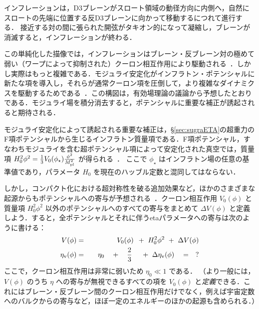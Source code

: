 インフレーションは，D3ブレーンがスロート領域の動径方向に内側へ，自然にスロートの先端に位置する反D3ブレーンに向かって移動するにつれて進行する．
接近する対の間に張られた開弦がタキオン的になって凝縮し，ブレーンが消滅すると，インフレーションが終わる．


この単純化した描像では，インフレーションはブレーン・反ブレーン対の極めて弱い（ワープによって抑制された）クーロン相互作用により駆動される~\cite{KKLMMT}．しかし実際はもっと複雑である．モジュライ安定化がインフラトン・ポテンシャルに新たな項を導入し，それらが通常クーロン項を圧倒して，より複雑なダイナミクスを駆動するためである~\cite{KKLMMT,Baumann:2006th, Baumann:2007np, Baumann:2007ah, Krause:2007jk, Baumann:2008kq}．この構図は，有効場理論の議論から予想したとおりである．モジュライ場を積分消去すると，ポテンシャルに重要な補正が誘起されると期待される．

\vskip 6pt
モジュライ安定化によって誘起される重要な補正は，\S\ref{sec:sugraETA}の超重力のF項ポテンシャルから生じるインフラトン質量項である．F項ポテンシャル，すなわちモジュライを含む超ポテンシャル項によって安定化された真空では，質量項 $H^2_0 \phi^2 = \frac{1}{3} V_0(\phi_\star) \frac{\phi^2}{M_{\rm pl}^2}$ が得られる~\cite{KKLMMT}．
ここで $\phi_\star$ はインフラトン場の任意の基準値であり，パラメータ $H_0$ を現在のハッブル定数と混同してはならない．

しかし，コンパクト化における超対称性を破る追加効果など，ほかのさまざまな起源からもポテンシャルへの寄与が予想される~\cite{Baumann:2008kq}．クーロン相互作用 $V_{0}(\phi)$ と質量項 $H_0^2 \phi^2$ 以外のポテンシャルへのすべての寄与をまとめて $\Delta V(\phi)$ と定義しよう．すると，全ポテンシャルとそれに伴うetaパラメータへの寄与は次のように書ける：
\begin{eqnarray}
\label{equ:Vphi}
V(\phi) &=& V_{0}(\phi) \ \, + \ H^2_0 \phi^2 \ + \ \Delta V(\phi) \\
\eta_{\rm v}(\phi) &=& \quad \eta_0 \quad +  \quad\frac{2}{3} \ \ \ \ + \  \Delta \eta_{\rm v}(\phi) \quad = \quad  ?
\end{eqnarray}
ここで，クーロン相互作用は非常に弱いため $\eta_0\ll 1$ である．
（より一般には，$V(\phi)$ のうち $\eta$ への寄与が無視できるすべての項を $V_0(\phi)$ と{\it 定義}できる．これにはブレーン・反ブレーン間のクーロン相互作用だけでなく，例えば宇宙定数へのバルクからの寄与など，ほぼ一定のエネルギーのほかの起源も含められる．）


